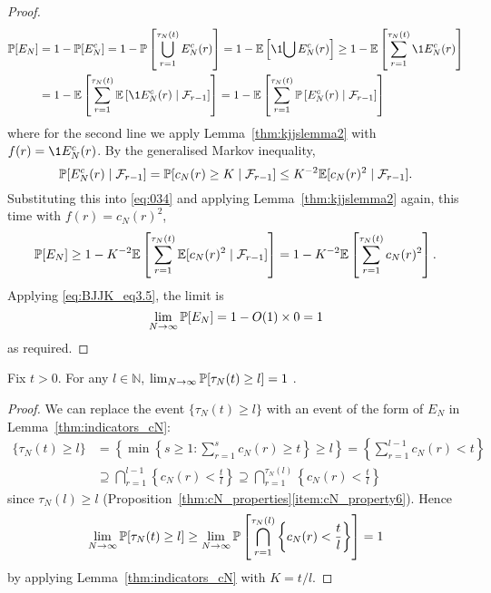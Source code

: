 \begin{proof}
\begin{align}
\Prob[E_N]
&= 1- \Prob[E_N^c]
= 1- \Prob\left[ \bigcup_{r=1}^{\tau_N(t)} E_N^c(r) \right]
= 1- \E\left[ \1{\bigcup E_N^c(r)} \right]
\geq 1 - \E\left[ \sum_{r=1}^{\tau_N(t)} \1{E_N^c(r)} \right] \notag\\
&= 1- \E\left[  \sum_{r=1}^{\tau_N(t)} \E\left[ \1{E_N^c(r)} 
        \mid \mathcal{F}_{r-1} \right] \right]
= 1- \E\left[  \sum_{r=1}^{\tau_N(t)} \Prob\left[ E_N^c(r)
        \mid \mathcal{F}_{r-1} \right] \right] \label{eq:034}
\end{align}
where for the second line we apply Lemma~\ref{thm:kjjslemma2} with $f(r) = \1{E_N^c(r)} $.
By the generalised Markov inequality,
\begin{equation*}
\mathbb{P}[ E_N^c(r) \mid \mathcal{F}_{r-1} ]
= \mathbb{P}[ c_N(r) \geq K \mid \mathcal{F}_{r-1} ]
\leq K^{-2} \mathbb{E}[c_N(r)^2 \mid \mathcal{F}_{r-1} ] .
\end{equation*}
Substituting this into \eqref{eq:034} and applying Lemma~\ref{thm:kjjslemma2} again, this time with $f(r) = c_N(r)^2$,
\begin{equation*}
\mathbb{P}[E_N]
\geq 1- K^{-2} \mathbb{E}\left[  \sum_{r=1}^{\tau_N(t)} 
        \mathbb{E}[c_N(r)^2 \mid \mathcal{F}_{r-1} ] \right]
= 1 - K^{-2} \mathbb{E}\left[  \sum_{r=1}^{\tau_N(t)} c_N(r)^2 \right] .
\end{equation*}
Applying \eqref{eq:BJJK_eq3.5}, the limit is
\begin{equation*}
\lim_{N\to\infty} \mathbb{P}[E_N]
= 1 - O(1) \times 0
=1 
\end{equation*}
as required.
\end{proof}


\begin{lemma}\label{thm:indicators_tau}
Fix $t>0$. For any $l \in \mathbb{N}$,
$\lim_{N\to\infty} \mathbb{P}[ \tau_N(t) \geq l ] =1$ .
\end{lemma}

\begin{proof}
We can replace the event $\{ \tau_N(t) \geq l \}$ with an event of the form of $E_N$ in Lemma~\ref{thm:indicators_cN}:
\begin{align*}
\{ \tau_N(t) \geq l \} 
&= \left\{ \min \left\{ s \geq 1 : \sum_{r=1}^{s} c_N(r) \geq t \right\} \geq l \right\}
= \left\{ \sum_{r=1}^{l-1} c_N(r) < t \right\} \\
&\supseteq \bigcap_{r=1}^{l-1} \left \{ c_N(r) < \frac{t}{l} \right\}
\supseteq \bigcap_{r=1}^{\tau_N(l)} \left \{ c_N(r) < \frac{t}{l} \right\} 
\end{align*}
since $\tau_N(l) \geq l$ (Proposition~\ref{thm:cN_properties}\ref{item:cN_property6}).
Hence
\begin{equation*}
\lim_{N\to\infty} \mathbb{P}[ \tau_N(t) \geq l ] 
\geq \lim_{N\to\infty} \mathbb{P}\left[ \bigcap_{r=1}^{\tau_N(l)} 
        \left \{ c_N(r) < \frac{t}{l} \right\} \right]
=1
\end{equation*}
by applying Lemma~\ref{thm:indicators_cN} with $K=t/l$.
\end{proof}



